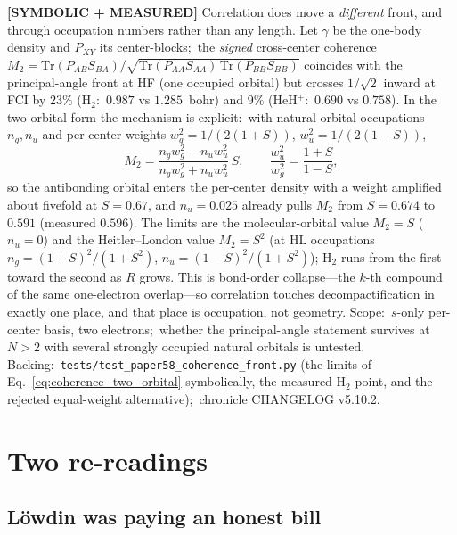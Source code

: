 \documentclass[aps,pra,twocolumn,superscriptaddress,longbibliography]{revtex4-2}
\newcommand{\gvq}[2]{#2}
\begin{document}
\textbf{[SYMBOLIC + MEASURED]} Correlation does move a \emph{different}
front, and through occupation numbers rather than any length.  Let $\gamma$
be the one-body density and $P_{XY}$ its center-blocks;\ the \emph{signed}
cross-center coherence
$M_2 = \mathrm{Tr}(P_{AB}S_{BA})/\sqrt{\mathrm{Tr}(P_{AA}S_{AA})\,\mathrm{Tr}(P_{BB}S_{BB})}$
coincides with the principal-angle front at HF (one occupied orbital) but
crosses $1/\sqrt2$ inward at FCI by $\gvq{coherence_shift_h2}{23}\%$
(H$_2$:\ $0.987$ vs $1.285$~bohr) and $\gvq{coherence_shift_heh}{9}\%$
(HeH$^+$:\ $0.690$ vs $0.758$).  In the two-orbital form the mechanism is
explicit:\ with natural-orbital occupations $n_g, n_u$ and per-center
weights $w_g^2 = 1/(2(1+S))$, $w_u^2 = 1/(2(1-S))$,
\begin{equation}
  M_2 = \frac{n_g w_g^2 - n_u w_u^2}{n_g w_g^2 + n_u w_u^2}\,S,
  \qquad \frac{w_u^2}{w_g^2} = \frac{1+S}{1-S},
  \label{eq:coherence_two_orbital}
\end{equation}
so the antibonding orbital enters the per-center density with a weight
amplified about fivefold at $S = 0.67$, and $n_u = 0.025$ already pulls
$M_2$ from $S = 0.674$ to $0.591$ (measured $0.596$).  The limits are the
molecular-orbital value $M_2 = S$ ($n_u = 0$) and the Heitler--London value
$M_2 = S^2$ (at HL occupations $n_g = (1+S)^2/(1+S^2)$,
$n_u = (1-S)^2/(1+S^2)$); H$_2$ runs from the first toward the second as $R$
grows.  This is bond-order collapse---the $k$-th compound of the same
one-electron overlap---so correlation touches decompactification in exactly
one place, and that place is occupation, not geometry.  Scope:\ $s$-only
per-center basis, two electrons;\ whether the principal-angle statement
survives at $N > 2$ with several strongly occupied natural orbitals is
untested.  Backing:\ \texttt{tests/test\_paper58\_coherence\_front.py} (the
limits of Eq.~\eqref{eq:coherence_two_orbital} symbolically, the measured
H$_2$ point, and the rejected equal-weight alternative);\ chronicle
CHANGELOG v5.10.2.

\section{Two re-readings}
\label{sec:rereadings}

\subsection{L\"owdin was paying an honest bill}
\end{document}
